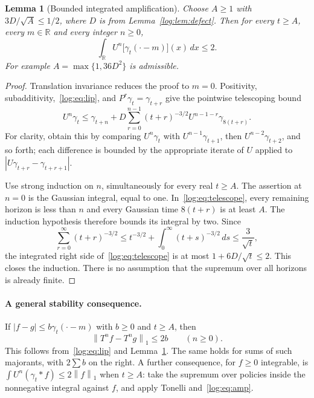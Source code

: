 \documentclass[11pt,a4paper]{article}
\newtheorem{lemma}[theorem]{Lemma}
\theoremstyle{definition}\newtheorem{definition}[theorem]{Definition}
\theoremstyle{remark}\newtheorem{remark}[theorem]{Remark}
\newcommand{\R}{\mathbb R}
\newcommand{\norm}[1]{\left\|#1\right\|_1}
\numberwithin{equation}{section}
\begin{document}
\begin{lemma}[Bounded integrated amplification]\label{log:lem:amp}
Choose $A\ge1$ with $3D/\sqrt A\le1/2$, where $D$ is from
Lemma~\ref{log:lem:defect}. Then for every $t\ge A$, every $m\in\R$
and every integer $n\ge0$,
\begin{equation}\label{log:eq:amp}
 \boxed{\int_\R U^n\bigl[\gamma_t(\cdot-m)\bigr](x)\,dx\le2.}
\end{equation}
For example $A=\max\{1,36D^2\}$ is admissible.
\end{lemma}
\begin{proof}
Translation invariance reduces the proof to $m=0$. Positivity,
subadditivity,~\eqref{log:eq:lip}, and $P^r\gamma_t=\gamma_{t+r}$ give
the pointwise telescoping bound
\begin{equation}\label{log:eq:telescope}
 U^n\gamma_t\le\gamma_{t+n}
 +D\sum_{r=0}^{n-1}(t+r)^{-3/2}
                   U^{n-1-r}\gamma_{8(t+r)}.
\end{equation}
For clarity, obtain this by comparing $U^n\gamma_t$ with
$U^{n-1}\gamma_{t+1}$, then $U^{n-2}\gamma_{t+2}$, and so forth;
each difference is bounded by the appropriate iterate of $U$ applied
to $|U\gamma_{t+r}-\gamma_{t+r+1}|$.

Use strong induction on $n$, simultaneously for every real $t\ge A$.
The assertion at $n=0$ is the Gaussian integral, equal to one.
In~\eqref{log:eq:telescope}, every remaining horizon is less than $n$
and every Gaussian time $8(t+r)$ is at least $A$. The induction
hypothesis therefore bounds its integral by two. Since
\[
 \sum_{r=0}^\infty(t+r)^{-3/2}
 \le t^{-3/2}+\int_0^\infty(t+s)^{-3/2}\,ds
 \le\frac3{\sqrt t},
\]
the integrated right side of~\eqref{log:eq:telescope} is at most
$1+6D/\sqrt t\le2$. This closes the induction. There is no assumption
that the supremum over all horizons is already finite.
\end{proof}

\paragraph{A general stability consequence.}
If $|f-g|\le b\gamma_t(\cdot-m)$ with $b\ge0$ and $t\ge A$, then
\begin{equation}\label{log:eq:stab}
 \norm{T^nf-T^ng}\le2b\qquad(n\ge0).
\end{equation}
This follows from~\eqref{log:eq:lip} and Lemma~\ref{log:lem:amp}.
The same holds for sums of such majorants, with $2\sum b$ on the
right. A further consequence, for $f\ge0$ integrable, is
$\int U^n(\gamma_t*f)\le2\norm f$ when $t\ge A$:
take the supremum over policies inside the nonnegative integral
against $f$, and apply Tonelli and~\eqref{log:eq:amp}.
\end{document}
